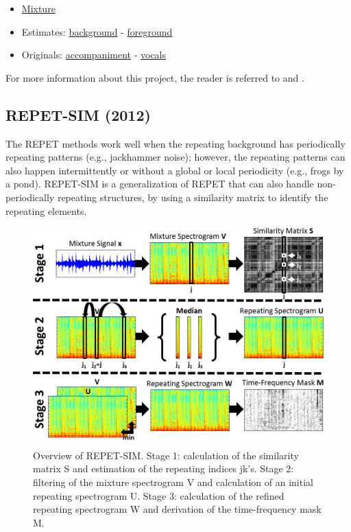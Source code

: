 \documentclass{article}
\begin{document}
\begin{itemize}[noitemsep,topsep=0pt]
\item \href{Audio/REPET/dev2__another_dreamer-the_ones_we_love__snip_69_94__mix.wav}{Mixture}
\item Estimates: \href{Audio/REPET/dev2__another_dreamer-the_ones_we_love__snip_69_94__mix_background.wav}{background} - \href{Audio/REPET/dev2__another_dreamer-the_ones_we_love__snip_69_94__mix_foreground.wav}{foreground}
\item Originals: \href{Audio/REPET/dev2__another_dreamer-the_ones_we_love__snip_69_94__mix-vocals.wav}{accompaniment} - \href{Audio/REPET/dev2__another_dreamer-the_ones_we_love__snip_69_94__vocals.wav}{vocals}
\end{itemize}

For more information about this project, the reader is referred to \cite{inproceedings_liutkus_mar2012} and \cite{inbook_rafii_2014}.


\subsection{REPET-SIM (2012)}
\label{ssec:repet_sim}

The REPET methods work well when the repeating background has periodically repeating patterns (e.g., jackhammer noise); however, the repeating patterns can also happen intermittently or without a global or local periodicity (e.g., frogs by a pond). REPET-SIM is a generalization of REPET that can also handle non-periodically repeating structures, by using a similarity matrix to identify the repeating elements.

\begin{figure}[!htb]
\centering
\includegraphics[width=\columnwidth]{Images/repet_sim_overview.png}
\caption{Overview of REPET-SIM. Stage 1: calculation of the similarity matrix S and estimation of the repeating indices jk’s. Stage 2: filtering of the mixture spectrogram V and calculation of an initial repeating spectrogram U. Stage 3: calculation of the refined repeating spectrogram W and derivation of the time-frequency mask M.}
\label{fig:repet_sim_overview}
\end{figure}
\end{document}
